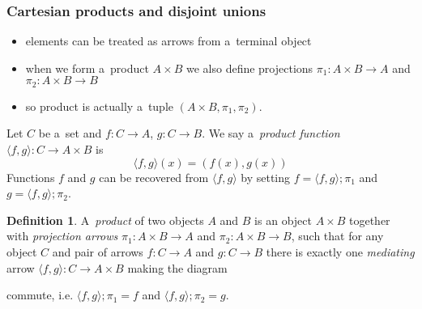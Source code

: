 \documentclass{amsart}
\theoremstyle{definition}
\newtheorem{definition}[thm]{Definition}
\renewcommand{\emph}{\textit} %
\begin{document}
\subsubsection{Cartesian products and disjoint unions}

\begin{itemize}
\item elements can be treated as arrows from a~terminal object
\item when we form a~product $A\times B$ we also define projections $\pi_{1}: A\times B \to A$ and $\pi_{2}: A\times B \to B$
\item so product is actually a~tuple $(A\times B, \pi_{1},\pi_{2})$.
\end{itemize}

Let $C$ be a~set and $f: C\to A$, $g: C\to B$. We say a~\emph{product function} $\langle f,g\rangle: C \to A\times B$ is
\[
\langle f, g\rangle (x) = (f(x), g(x))
\]
Functions $f$ and $g$ can be recovered from $\langle f, g\rangle$ by setting $f = \langle f,g\rangle;\! \pi_{1}$ and $g = \langle f, g\rangle;\! \pi_{2}$.

\begin{definition}
  A~\emph{product} of two objects $A$ and $B$ is an object $A\times B$ together with \emph{projection arrows} $\pi_{1}: A\times B \to A$ and $\pi_{2}: A\times B \to B$, such that for any object $C$ and pair of arrows $f: C\to A$ and $g: C\to B$ there is exactly one \emph{mediating} arrow $\langle f,g\rangle: C\to A\times B$ making the diagram
  
  \begin{center}
  \end{center}
  commute, i.e. $\langle f,g\rangle;\! \pi_{1} = f$ and $\langle f,g\rangle;\! \pi_{2} = g$.
\end{definition}
\end{document}
